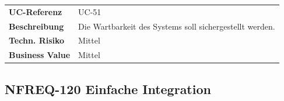 \begin{longtable}[c]{@{}ll@{}}
\toprule
\begin{minipage}[t]{0.20\columnwidth}\raggedright\strut
\textbf{UC-Referenz}
\strut\end{minipage} &
\begin{minipage}[t]{0.74\columnwidth}\raggedright\strut
UC-51
\strut\end{minipage}\tabularnewline
\begin{minipage}[t]{0.20\columnwidth}\raggedright\strut
\textbf{Beschreibung}
\strut\end{minipage} &
\begin{minipage}[t]{0.74\columnwidth}\raggedright\strut
Die Wartbarkeit des Systems soll sichergestellt werden.
\strut\end{minipage}\tabularnewline
\begin{minipage}[t]{0.20\columnwidth}\raggedright\strut
\textbf{Techn. Risiko}
\strut\end{minipage} &
\begin{minipage}[t]{0.74\columnwidth}\raggedright\strut
Mittel
\strut\end{minipage}\tabularnewline
\begin{minipage}[t]{0.20\columnwidth}\raggedright\strut
\textbf{Business Value}
\strut\end{minipage} &
\begin{minipage}[t]{0.74\columnwidth}\raggedright\strut
Mittel
\strut\end{minipage}\tabularnewline
\bottomrule
\end{longtable}

\subsection{NFREQ-120 Einfache
Integration}\label{nfreq-120-einfache-integration}

